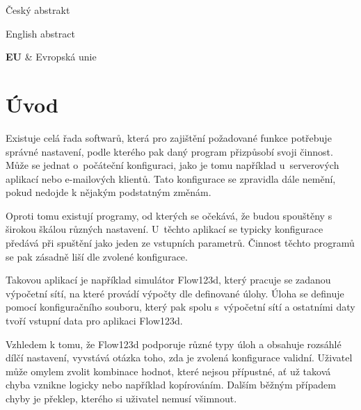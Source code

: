 \documentclass[FM,DP]{tulthesis}
\begin{document}

\begin{abstractCZ}
\thispagestyle{empty}
Český abstrakt
\end{abstractCZ}

\vspace{2cm}
\begin{abstractEN}
English abstract
\end{abstractEN}

\clearpage
\begin{acknowledgement}

\end{acknowledgement}

\tableofcontents
\clearpage

\begin{abbrList}
\textbf{EU} & Evropská unie \\
\end{abbrList}

\chapter*{Úvod}


Existuje celá řada softwarů, která pro zajištění požadované funkce potřebuje správné nastavení, podle kterého pak daný program přizpůsobí svoji činnost. Může se jednat o~počáteční konfiguraci, jako je tomu například u~serverových aplikací nebo e-mailových klientů. Tato konfigurace se zpravidla dále nemění, pokud nedojde k nějakým podstatným změnám.

Oproti tomu existují programy, od kterých se očekává, že budou spouštěny s širokou škálou různých nastavení. U~těchto aplikací se typicky konfigurace předává při spuštění jako jeden ze vstupních parametrů. Činnost těchto programů se pak zásadně liší dle zvolené konfigurace.

Takovou aplikací je například simulátor Flow123d, který pracuje se zadanou výpočetní sítí, na které provádí výpočty dle definované úlohy. Úloha se definuje pomocí konfiguračního souboru, který pak spolu s~výpočetní sítí a ostatními daty tvoří vstupní data pro aplikaci Flow123d.

Vzhledem k tomu, že Flow123d podporuje různé typy úloh a obsahuje rozsáhlé dílčí nastavení, vyvstává otázka toho, zda je zvolená konfigurace validní. Uživatel může omylem zvolit kombinace hodnot, které nejsou přípustné, ať už taková chyba vznikne logicky nebo například kopírováním. Dalším běžným případem chyby je překlep, kterého si uživatel nemusí všimnout.
\end{document}
